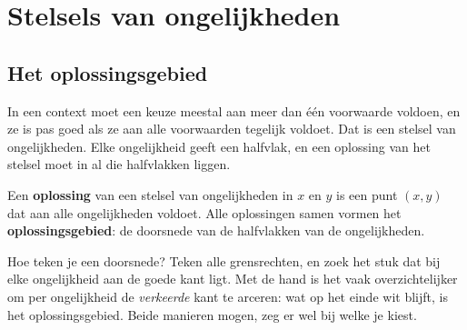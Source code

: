 \section{Stelsels van ongelijkheden}

\subsection{Het oplossingsgebied}

In een context moet een keuze meestal aan meer dan één voorwaarde voldoen, en ze is pas goed als ze aan alle voorwaarden tegelijk voldoet. Dat is een stelsel van ongelijkheden. Elke ongelijkheid geeft een halfvlak, en een oplossing van het stelsel moet in al die halfvlakken liggen.

\begin{theorie}
Een \textbf{\textcolor{accent}{oplossing}} van een stelsel van ongelijkheden in $x$ en $y$ is een punt $(x, y)$ dat aan alle ongelijkheden voldoet. Alle oplossingen samen vormen het \textbf{\textcolor{accent}{oplossingsgebied}}: de doorsnede van de halfvlakken van de ongelijkheden.
\end{theorie}

Hoe teken je een doorsnede? Teken alle grensrechten, en zoek het stuk dat bij elke ongelijkheid aan de goede kant ligt. Met de hand is het vaak overzichtelijker om per ongelijkheid de \textit{verkeerde} kant te arceren: wat op het einde wit blijft, is het oplossingsgebied. Beide manieren mogen, zeg er wel bij welke je kiest.

